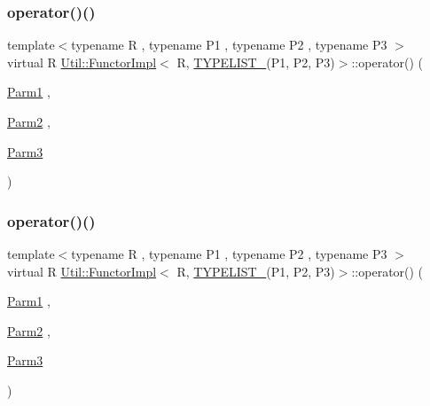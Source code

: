 \subsubsection{\texorpdfstring{operator()()}{operator()()}\hspace{0.1cm}{\footnotesize\ttfamily [1/2]}}
{\footnotesize\ttfamily template$<$typename R , typename P1 , typename P2 , typename P3 $>$ \\
virtual R \mbox{\hyperlink{classUtil_1_1FunctorImpl}{Util\+::\+Functor\+Impl}}$<$ R, \mbox{\hyperlink{install_2include_2adat_2typelist_8h_a0309f68a543c5c0994f9edc0e56dc59f}{T\+Y\+P\+E\+L\+I\+S\+T\+\_}}(P1, P2, P3)$>$\+::operator() (\begin{DoxyParamCaption}\item[{\mbox{\hyperlink{structUtil_1_1Private_1_1FunctorImplBase_a9d61e693d6c616dea5bd9d9073c7d21a}{Parm1}}}]{,  }\item[{\mbox{\hyperlink{structUtil_1_1Private_1_1FunctorImplBase_a554085cd798ef14838a59b528f0feb2e}{Parm2}}}]{,  }\item[{\mbox{\hyperlink{structUtil_1_1Private_1_1FunctorImplBase_a052148e627fd4caecbcffdbdf1033dbb}{Parm3}}}]{ }\end{DoxyParamCaption})\hspace{0.3cm}{\ttfamily [pure virtual]}}

\mbox{\label{classUtil_1_1FunctorImpl_3_01R_00_01TYPELIST__3_07P1_00_01P2_00_01P3_08_4_a80ceaa256d42f98c4523dea840906200}} 
\subsubsection{\texorpdfstring{operator()()}{operator()()}\hspace{0.1cm}{\footnotesize\ttfamily [2/2]}}
{\footnotesize\ttfamily template$<$typename R , typename P1 , typename P2 , typename P3 $>$ \\
virtual R \mbox{\hyperlink{classUtil_1_1FunctorImpl}{Util\+::\+Functor\+Impl}}$<$ R, \mbox{\hyperlink{install_2include_2adat_2typelist_8h_a0309f68a543c5c0994f9edc0e56dc59f}{T\+Y\+P\+E\+L\+I\+S\+T\+\_}}(P1, P2, P3)$>$\+::operator() (\begin{DoxyParamCaption}\item[{\mbox{\hyperlink{structUtil_1_1Private_1_1FunctorImplBase_a9d61e693d6c616dea5bd9d9073c7d21a}{Parm1}}}]{,  }\item[{\mbox{\hyperlink{structUtil_1_1Private_1_1FunctorImplBase_a554085cd798ef14838a59b528f0feb2e}{Parm2}}}]{,  }\item[{\mbox{\hyperlink{structUtil_1_1Private_1_1FunctorImplBase_a052148e627fd4caecbcffdbdf1033dbb}{Parm3}}}]{ }\end{DoxyParamCaption})\hspace{0.3cm}{\ttfamily [pure virtual]}}



